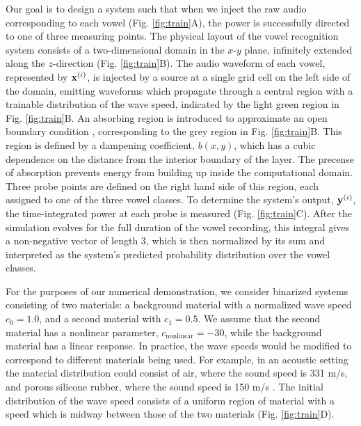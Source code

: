 Our goal is to design a system such that when we inject the raw audio corresponding to each vowel (Fig. \ref{fig:train}A), the power is successfully directed to one of three measuring points.
The physical layout of the vowel recognition system consists of a two-dimensional domain in the $x$-$y$ plane, infinitely extended along the $z$-direction (Fig. \ref{fig:train}B). 
The audio waveform of each vowel, represented by $\mathbf{x}^{(i)}$, is injected by a source at a single grid cell on the left side of the domain, emitting waveforms which propagate through a central region with a trainable distribution of the wave speed, indicated by the light green region in Fig. \ref{fig:train}B. 
An absorbing region is introduced to approximate an open boundary condition \cite{oskooi_failure_2008}, corresponding to the grey region in Fig. \ref{fig:train}B. 
This region is defined by a dampening coefficient, $b{(x,y)}$, which has a cubic dependence on the distance from the interior boundary of the layer.
The precense of absorption prevents energy from building up inside the computational domain.
Three probe points are defined on the right hand side of this region, each assigned to one of the three vowel classes. 
To determine the system's output, $\mathbf{y}^{(i)}$, the time-integrated power at each probe is measured (Fig. \ref{fig:train}C). 
After the simulation evolves for the full duration of the vowel recording, this integral gives a non-negative vector of length 3, which is then normalized by its sum and interpreted as the system's predicted probability distribution over the vowel classes. 

For the purposes of our numerical demonstration, we consider binarized systems consisting of two materials: a background material with a normalized wave speed $c_0 = 1.0$, and a second material with $c_1 = 0.5$.
We assume that the second material has a nonlinear parameter, $c_{\text{nonlinear}} = -30$, while the background material has a linear response.
In practice, the wave speeds would be modified to correspond to different materials being used.
For example, in an acoustic setting the material distribution could consist of air, where the sound speed is 331 m/s, and porous silicone rubber, where the sound speed is 150 m/s \cite{ba_soft_2017}.
The initial distribution of the wave speed consists of a uniform region of material with a speed which is midway between those of the two materials (Fig. \ref{fig:train}D).


